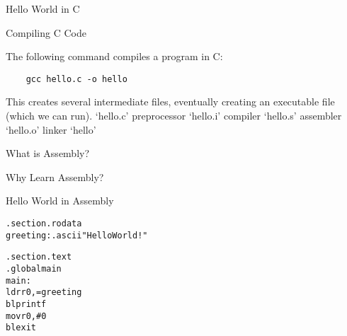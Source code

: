 

\begin{frame}{Hello World in C}
\end{frame}


\begin{frame}[fragile]{Compiling C Code}

The following command compiles a program in C:

\begin{verbatim}
    gcc hello.c -o hello
\end{verbatim}

This creates several intermediate files, eventually creating an executable file (which we can run).
`hello.c'
preprocessor
`hello.i'
compiler
`hello.s'
assembler
`hello.o'
linker
`hello'

\end{frame}

\begin{frame}{What is Assembly?}
\end{frame}


\begin{frame}{Why Learn Assembly?}
\end{frame}


\begin{frame}[fragile]{Hello World in Assembly}
    \begin{alltt}
.section .rodata
greeting: .ascii "Hello World!\n\0"

.section .text
.global main
main:
    ldr r0, =greeting
    bl printf
    mov r0, \#0
    bl exit
\end{alltt}
\end{frame}

